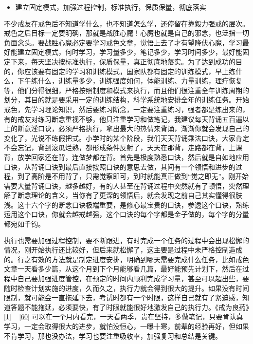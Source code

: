 \begin{itemize}
    \item 建立固定模式，加强过程控制，标准执行，保质保量，彻底落实
\end{itemize}

不少戒友在戒色后不知道学什么，也不知道怎么学，还停留在靠毅力强戒的层次。戒色之后目标一定要明确，那就是战胜心魔！心魔也就是自己的邪念，也泛指一切负面念头。要战胜心魔必定要学习戒色文章，觉悟上去了才有望降伏心魔，学习最好能建立固定模式，何时学习，学习量多少，笔记多少，学习时间多少，最好能固定下来，每天坚决按标准执行，保质保量，真正彻底地落实。为了达到成功的目的，你应该要有固定的学习和训练模式，国家队都有固定的训练模式，早上练什么，下午练什么，训练量多少，训练强度如何，体能训练、力量训练，理疗恢复等，他们分得很细，严格按照制度和模式来执行，而且他们很注重全年训练周期的划分，其目的就是要采用一定的训练结构，科学系统地安排全年的训练任务。开始戒色，先学习理论知识，然后要练习断念，一定要注重练习，强者都是练出来的，有的戒友对练习断念重视不够，他只注重学习和做笔记，我建议每天背诵五百遍以上的断意淫口诀，必须严格执行，拿出最大的热情来背诵，渐渐你就会发现自己的变化了，光说不练假把式。小学时的某个阶段，我们天天背诵乘法口诀，大家肯定不会忘记，背到滚瓜烂熟，都形成条件反射了，天天在那背，走路都在背，上课背，放学回家还在背，连做梦都在背。首先是极度熟悉口诀，然后就是自如地应用口诀，从背诵口诀到最后直接按照口诀的意思去做，其间有一个领悟和进步的过程，到了高阶是不用背了，只需觉察即可，到时就能真正做到“觉之即无”。刚开始需要大量背诵口诀，越多越好，有的人甚至在背诵过程中突然就有了顿悟，突然理解了断念理论的含义，当你有了更深的领悟后，就会发现之前自己其实懂得很肤浅。这十六个字的断念口诀极端重要，是修心最宝贵的口诀，参透这个口诀，熟练运用这个口诀，你就会越戒越强，这个口诀的每个字都是金子做的，每个字的分量都宛如千钧。

执行也需要加强过程控制，要不断跟进，有时完成一个任务的过程中会出现松懈的情况，刚开始执行还比较好，但后来就松懈了，这主要是过程中未严格控制造成的。行之有效的方法就是制定进度安排，明确到哪天需要完成什么任务，比如戒色文章一天看多少篇，从这个月到下个月能够看几篇，最好能预先计划下，然后在过程中自己要加强进度管控，在预定的时间内顺利完成学习量，甚至可以超出些，要随时检查计划实施的进度，久而久之，执行力就会得到很大的提升。如果没有时间限制，就可能会一直拖延下去，考试时都有一个时限，这样自己就有了紧迫感，知道答题不能拖延，必须要快，有了时限就能很好地激发自己的执行力。《戒为良药》\ref{1} ~ \ref{60} 可以在一个月内看完，一天看两季，贵在坚持，多做笔记，只要肯认真学习，一定会取得很大的进步，就怕没恒心，一曝十寒，前辈的经验再好，但如果不肯学习，那也没办法，学习也要注重吸收率，加强复习和总结是关键。

